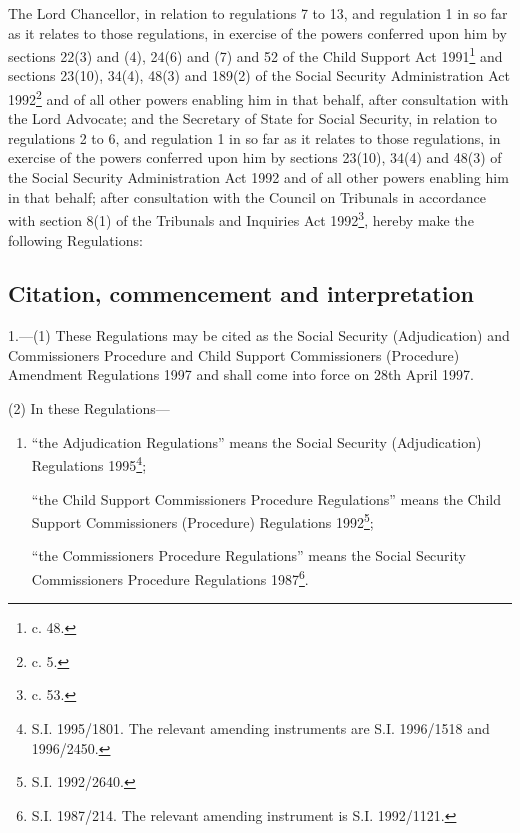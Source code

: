 \documentclass[12pt,a4paper]{article}
\title{\regstitle}
\author{S.I. 1997 No. 955}
\date{Made 18th March 1997\\Laid before Parliament 20th March 1997\\Coming into force 28th April 1997}
\begin{document}
\maketitle

\noindent
The Lord Chancellor, in relation to regulations 7 to 13, and regulation 1 in so far as it relates to those regulations, in exercise of the powers conferred upon him by sections 22(3) and (4), 24(6) and (7) and 52 of the Child Support Act 1991\footnote{ c. 48.} and sections 23(10), 34(4), 48(3) and 189(2) of the Social Security Administration Act 1992\footnote{ c. 5.} and of all other powers enabling him in that behalf, after consultation with the Lord Advocate; and the Secretary of State for Social Security, in relation to regulations 2 to 6, and regulation 1 in so far as it relates to those regulations, in exercise of the powers conferred upon him by sections 23(10), 34(4) and 48(3) of the Social Security Administration Act 1992 and of all other powers enabling him in that behalf; after consultation with the Council on Tribunals in accordance with section 8(1) of the Tribunals and Inquiries Act 1992\footnote{ c. 53.}, hereby make the following Regulations:

{\sloppy

\tableofcontents

}

\bigskip

\setcounter{secnumdepth}{-2}

\subsection[1. Citation, commencement and interpretation]{Citation, commencement and interpretation}

1.—(1) These Regulations may be cited as the Social Security (Adjudication) and Commissioners Procedure and Child Support Commissioners (Procedure) Amendment Regulations 1997 and shall come into force on 28th April 1997.

(2) In these Regulations—
\begin{enumerate}\item[]
“the Adjudication Regulations” means the Social Security (Adjudication) Regulations 1995\footnote{\frenchspacing S.I. 1995/1801. The relevant amending instruments are S.I. 1996/1518 and 1996/2450.};

“the Child Support Commissioners Procedure Regulations” means the Child Support Commissioners (Procedure) Regulations 1992\footnote{\frenchspacing S.I. 1992/2640.};

“the Commissioners Procedure Regulations” means the Social Security Commissioners Procedure Regulations 1987\footnote{\frenchspacing S.I. 1987/214. The relevant amending instrument is S.I. 1992/1121.}.
\end{enumerate}
\end{document}

